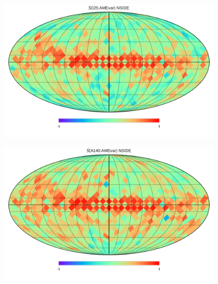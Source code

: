       \begin{figure}
        \includegraphics[width=\textwidth]{../Plots/Allsky_Corr/Spearman_Map_nside8_I25toAMEvar.pdf}
        \centering
        \caption{}
        \label{fig:Spearman_Map_nside8_AMEtoIR_I25}
      \end{figure}
      \begin{figure}
        \includegraphics[width=\textwidth]{../Plots/Allsky_Corr/Spearman_Map_nside8_A140toAMEvar.pdf}
        \centering
        \caption{}
        \label{fig:Spearman_Map_nside8_AMEtoIR_A140}
      \end{figure}

